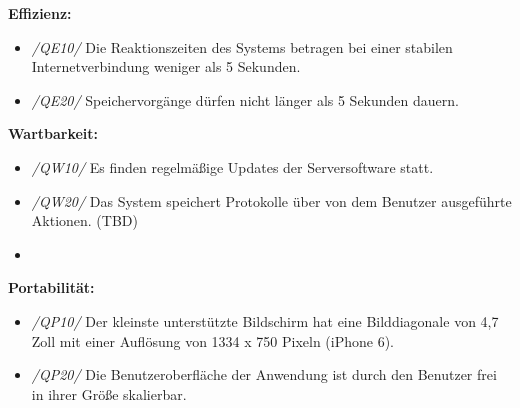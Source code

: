 \vspace{0.5cm}
\textbf{Effizienz:}
\begin{itemize}
    \item[] \emph{/QE10/} Die Reaktionszeiten des Systems betragen bei einer stabilen Internetverbindung weniger als 5 Sekunden.
    \item[] \emph{/QE20/} Speichervorgänge dürfen nicht länger als 5 Sekunden dauern.  
\end{itemize} 
\vspace{0.5cm}
\textbf{Wartbarkeit:}
\begin{itemize}
    \item[] \emph{/QW10/} Es finden regelmäßige Updates der Serversoftware statt.
    \item[] \emph{/QW20/} Das System speichert Protokolle über von dem Benutzer ausgeführte Aktionen. (TBD) 
    \item[] 
\end{itemize}
\vspace{0.5cm}
\textbf{Portabilität:}
\begin{itemize}
    \item[] \emph{/QP10/} Der kleinste unterstützte Bildschirm hat eine Bilddiagonale von 4,7 Zoll mit einer Auflösung von 1334 x 750 Pixeln (iPhone 6).
    \item[] \emph{/QP20/} Die Benutzeroberfläche der Anwendung ist durch den Benutzer frei in ihrer Größe skalierbar.
\end{itemize}